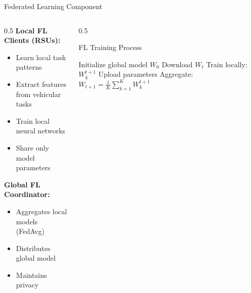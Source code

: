 \documentclass[aspectratio=169]{beamer}
\begin{document}
\begin{frame}{Federated Learning Component}
\begin{columns}
\begin{column}{0.5\textwidth}
\textbf{Local FL Clients (RSUs):}
\begin{itemize}
\item Learn local task patterns
\item Extract features from vehicular tasks
\item Train local neural networks
\item Share only model parameters
\end{itemize}

\vspace{0.3cm}
\textbf{Global FL Coordinator:}
\begin{itemize}
\item Aggregates local models (FedAvg)
\item Distributes global model
\item Maintains privacy
\end{itemize}
\end{column}
\begin{column}{0.5\textwidth}
\begin{block}{FL Training Process}
\begin{algorithmic}[1]
\STATE Initialize global model $W_0$
        \STATE Download $W_t$
        \STATE Train locally: $W_k^{t+1}$
        \STATE Upload parameters
    \ENDFOR
    \STATE Aggregate: $W_{t+1} = \frac{1}{K}\sum_{k=1}^K W_k^{t+1}$
\ENDFOR
\end{algorithmic}
\end{block}
\end{column}
\end{columns}
\end{frame}
\end{document}
